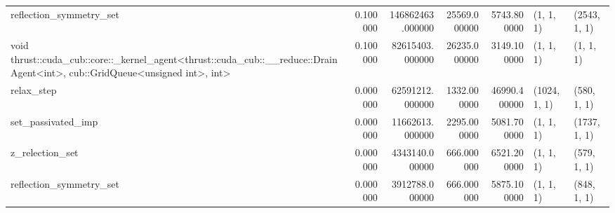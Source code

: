 \begin{tabular}{lrrrrll}
reflection\_symmetry\_set & 0.100000 & 146862463.000000 & 25569.000000 & 5743.800000 & (1, 1, 1) & (2543, 1, 1) \\
void thrust::cuda\_cub::core::\_kernel\_agent<thrust::cuda\_cub::\_\_reduce::DrainAgent<int>, cub::GridQueue<unsigned int>, int> & 0.100000 & 82615403.000000 & 26235.000000 & 3149.100000 & (1, 1, 1) & (1, 1, 1) \\
relax\_step & 0.000000 & 62591212.000000 & 1332.000000 & 46990.400000 & (1024, 1, 1) & (580, 1, 1) \\
set\_passivated\_imp & 0.000000 & 11662613.000000 & 2295.000000 & 5081.700000 & (1, 1, 1) & (1737, 1, 1) \\
z\_relection\_set & 0.000000 & 4343140.000000 & 666.000000 & 6521.200000 & (1, 1, 1) & (579, 1, 1) \\
reflection\_symmetry\_set & 0.000000 & 3912788.000000 & 666.000000 & 5875.100000 & (1, 1, 1) & (848, 1, 1) \\
\bottomrule
\end{tabular}
